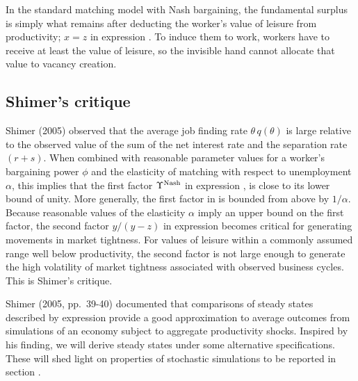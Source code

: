 In
the standard matching model with Nash bargaining, the fundamental surplus
is simply what remains  after deducting  the worker's value
of leisure from productivity; $x=z$ in expression .
To induce  them  to work, workers have to receive at least  the
value of  leisure, so the invisible hand cannot allocate  that value to
vacancy creation.


\subsection{Shimer's  critique}
Shimer  (2005) observed that  the average job finding rate
$\theta\, q(\theta)$ is large relative to the observed value of
the sum   of the net interest rate and the separation rate $(r+s)$. When
 combined with reasonable parameter values for a worker's
bargaining power $\phi$ and the elasticity of matching with
respect to unemployment $\alpha$, this  implies that the first factor
$\Upsilon^{\rm Nash}$ in expression ,
is close to
its lower bound of unity. More generally,
the first
factor in  is bounded from above by $1/\alpha$.
Because reasonable values of the elasticity $\alpha$ imply an upper bound on
the first factor,  the second factor
$y/(y-z)$ in expression  becomes
critical for  generating movements in market tightness.
For values of leisure within a commonly assumed range
well below productivity, the second factor is not large
enough to generate the high volatility of market
tightness associated with observed business cycles. This is  Shimer's critique.


Shimer (2005, pp.\ 39-40)  documented that comparisons of steady states described by   expression
provide a good approximation to average outcomes from
simulations of an economy subject to aggregate productivity shocks.
Inspired by his finding, we will
derive  steady states under some alternative specifications. These
will shed light on properties of stochastic simulations
to be reported in section .     %





